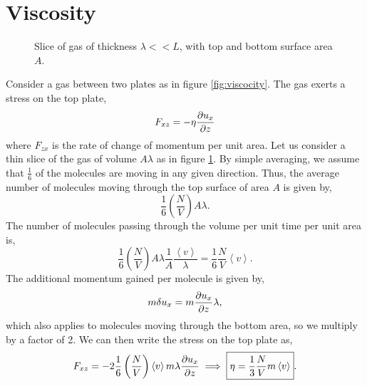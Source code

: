 \documentclass{book}
\begin{document}
\section{Viscosity}
\begin{figure}
	\centering
	\caption{Slice of gas of thickness $\lambda << L$, with top and bottom surface area $A$.}
	\label{fig:visc 2}
\end{figure}
Consider a gas between two plates as in figure \ref{fig:viscocity}. The gas exerts a stress on the top plate,
\begin{equation}
	F_{xz} = -\eta \pdv{u_x}{z}
\end{equation}
where $F_{zx}$ is the rate of change of momentum per unit area. Let us consider a thin slice of the gas of volume $A \lambda$ as in figure \ref{fig:visc 2}. By simple averaging, we assume that $\frac{1}{6}$ of the molecules are moving in any given direction. Thus, the average number of molecules moving through the top surface of area $A$ is given by,
\begin{equation}
	\frac{1}{6}\left(\frac{N}{V}\right)A\lambda.
\end{equation} 
The number of molecules passing through the volume per unit time per unit area is,
\begin{equation}
	\frac{1}{6}\left(\frac{N}{V}\right)A\lambda\frac{1}{A}\frac{\left<v\right>}{\lambda}=\frac{1}{6}\frac{N}{V}\left<v\right>.
\end{equation}
The additional momentum gained per molecule is given by,
\begin{equation}
	m\delta u_x = m\pdv{u_x}{z}\lambda,
\end{equation}
which also applies to molecules moving through the bottom area, so we multiply by a factor of 2. We can then write the stress on the top plate as,
\begin{equation}
	F_{xz} = -2\frac{1}{6}\left(\frac{N}{V}\right)\left<v\right>m\lambda\pdv{u_x}{z} \implies \boxed{\eta = \frac{1}{3}\frac{N}{V}m\left<v\right>}.
\end{equation}
\end{document}
